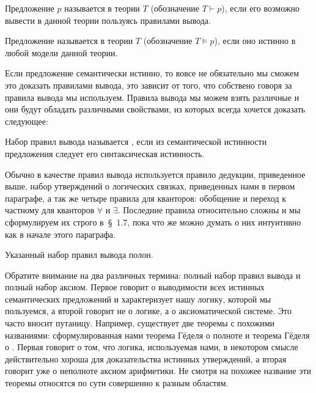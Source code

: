 \begin{definition}
Предложение $p$ называется  в теории $T$ (обозначение $T\vdash p$), если его возможно вывести в данной теории пользуясь правилами вывода.
\end{definition}

\begin{definition}
Предложение называется  в теории $T$ (обозначение $T\models p$), если оно истинно в любой модели данной теории.
\end{definition}

Если предложение семантически истинно, то вовсе не обязательно мы сможем это доказать правилами вывода, это зависит от того, что собствено говоря за правила вывода мы используем. Правила вывода мы можем взять различные и они будут обладать различными свойствами, из которых всегда хочется доказать следующее:

\begin{definition}
Набор правил вывода называется , если из семантической истинности предложения следует его синтаксическая истинность.
\end{definition}

Обычно в качестве правил вывода используется правило дедукции, приведенное выше, набор утверждений о логических связках, приведенных нами в первом параграфе, а так же четыре правила для кванторов: обобщение и переход к частному для кванторов $\forall$ и $\exists$. Последние правила относительно сложны и мы сформулируем их строго в~\S~1.7, пока что же можно думать о них интуитивно как в начале этого параграфа.

\begin{GodelsCompleteness}
Указанный набор правил вывода полон.
\end{GodelsCompleteness}

Обратите внимание на два различных термина: полный набор правил вывода и полный набор аксиом. Первое говорит о выводимости всех истинных семантических предложений  и характеризует нашу логику, которой мы пользуемся, а второй говорит не о логике, а о аксиоматической системе. Это часто вносит путаницу. Например, существует две теоремы с похожими названиями: сформулированная нами теорема Гёделя о полноте и теорема Гёделя о . Первая говорит о том, что логика, используемая нами, в некотором смысле действительно хороша для доказательства истинных утверждений, а вторая говорит уже о неполноте аксиом арифметики. Не смотря на похожее название эти теоремы относятся по сути совершенно к разным областям.


